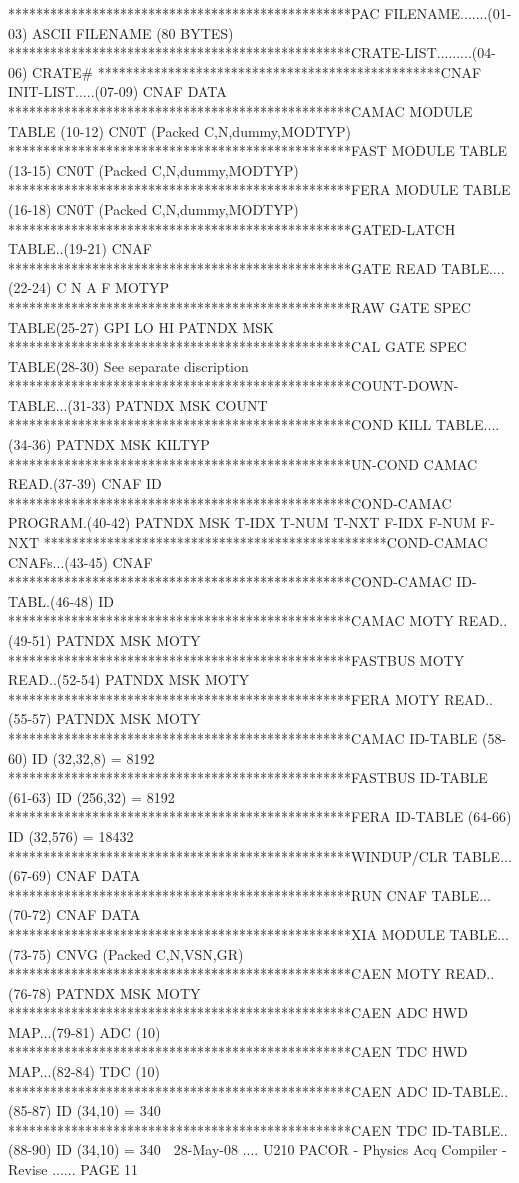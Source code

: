    *************************************************PAC FILENAME.......(01-03)
   ASCII FILENAME (80 BYTES)
   *************************************************CRATE-LIST.........(04-06)
   CRATE#
   *************************************************CNAF INIT-LIST.....(07-09)
   CNAF DATA
   *************************************************CAMAC MODULE TABLE (10-12)
   CN0T           (Packed C,N,dummy,MODTYP)
   *************************************************FAST  MODULE TABLE (13-15)
   CN0T           (Packed C,N,dummy,MODTYP)
   *************************************************FERA  MODULE TABLE (16-18)
   CN0T           (Packed C,N,dummy,MODTYP)
   *************************************************GATED-LATCH TABLE..(19-21)
   CNAF
   *************************************************GATE READ TABLE....(22-24)
   C N A F MOTYP
   *************************************************RAW GATE SPEC TABLE(25-27)
   GPI LO HI PATNDX MSK
   *************************************************CAL GATE SPEC TABLE(28-30)
   See separate discription
   *************************************************COUNT-DOWN-TABLE...(31-33)
   PATNDX MSK COUNT
   *************************************************COND KILL TABLE....(34-36)
   PATNDX MSK KILTYP
   *************************************************UN-COND CAMAC READ.(37-39)
   CNAF   ID
   *************************************************COND-CAMAC PROGRAM.(40-42)
   PATNDX MSK T-IDX T-NUM T-NXT F-IDX F-NUM F-NXT
   *************************************************COND-CAMAC CNAFs...(43-45)
   CNAF
   *************************************************COND-CAMAC ID-TABL.(46-48)
   ID
   *************************************************CAMAC   MOTY READ..(49-51)
   PATNDX MSK MOTY
   *************************************************FASTBUS MOTY READ..(52-54)
   PATNDX MSK MOTY
   *************************************************FERA    MOTY READ..(55-57)
   PATNDX MSK MOTY
   *************************************************CAMAC     ID-TABLE (58-60)
   ID (32,32,8) = 8192
   *************************************************FASTBUS   ID-TABLE (61-63)
   ID (256,32)  = 8192
   *************************************************FERA      ID-TABLE (64-66)
   ID (32,576)  = 18432
   *************************************************WINDUP/CLR TABLE...(67-69)
   CNAF DATA
   *************************************************RUN CNAF   TABLE...(70-72)
   CNAF DATA
   *************************************************XIA MODULE TABLE...(73-75)
   CNVG           (Packed C,N,VSN,GR)
   *************************************************CAEN    MOTY READ..(76-78)
   PATNDX MSK MOTY
   *************************************************CAEN ADC HWD MAP...(79-81)
   ADC (10)
   *************************************************CAEN TDC HWD MAP...(82-84)
   TDC (10)
   *************************************************CAEN ADC ID-TABLE..(85-87)
   ID (34,10) = 340
   *************************************************CAEN TDC ID-TABLE..(88-90)
   ID (34,10) = 340
    
   28-May-08 .... U210  PACOR -  Physics Acq Compiler - Revise ...... PAGE  11
 
